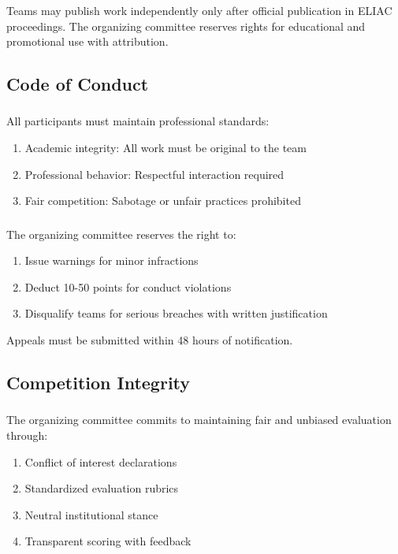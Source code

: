 \subsubsection{}
Teams may publish work independently only after official publication in ELIAC proceedings. The organizing committee reserves rights for educational and promotional use with attribution.

\subsection{Code of Conduct}

\subsubsection{}
All participants must maintain professional standards:
\begin{enumerate}[noitemsep]
    \item Academic integrity: All work must be original to the team
    \item Professional behavior: Respectful interaction required
    \item Fair competition: Sabotage or unfair practices prohibited
\end{enumerate}

\subsubsection{}
The organizing committee reserves the right to:
\begin{enumerate}[noitemsep]
    \item Issue warnings for minor infractions
    \item Deduct 10-50 points for conduct violations
    \item Disqualify teams for serious breaches with written justification
\end{enumerate}

Appeals must be submitted within 48 hours of notification.

\subsection{Competition Integrity}

\subsubsection{}
The organizing committee commits to maintaining fair and unbiased evaluation through:
\begin{enumerate}[noitemsep]
    \item Conflict of interest declarations
    \item Standardized evaluation rubrics
    \item Neutral institutional stance
    \item Transparent scoring with feedback
\end{enumerate}

